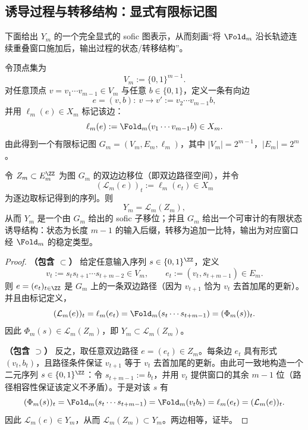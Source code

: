 \subsection{诱导过程与转移结构：显式有限标记图}\label{subsec:Phi_m-graph}

下面给出 $Y_m$ 的一个完全显式的 sofic 图表示，从而刻画“将 $\Fold_m$ 沿长轨迹连续重叠窗口施加后，输出过程的状态/转移结构”。

\begin{definition}\label{def:G_m}
令顶点集为
\[
V_m:=\{0,1\}^{m-1}.
\]
对任意顶点 $v=v_1\cdots v_{m-1}\in V_m$ 与任意 $b\in\{0,1\}$，定义一条有向边
\[
e=(v,b):\ v\to v':=v_2\cdots v_{m-1}b,
\]
并用 $\ell_m(e)\in X_m$ 标记该边：
\[
\ell_m(e):=\Fold_m(v_1\cdots v_{m-1}b)\in X_m.
\]
由此得到一个有限标记图 $G_m=(V_m,E_m,\ell_m)$，其中 $|V_m|=2^{m-1}$，$|E_m|=2^{m}$。
\end{definition}

\begin{theorem}\label{thm:Phi_m-sofic-graph}
令 $Z_m\subset E_m^{\ZZ}$ 为图 $G_m$ 的双边边移位（即双边路径空间），并令
\[
(\mathcal{L}_m(e))_t:=\ell_m(e_t)\in X_m
\]
为逐边取标记得到的序列。则
\[
Y_m=\mathcal{L}_m(Z_m),
\]
从而 $Y_m$ 是一个由 $G_m$ 给出的 sofic 子移位；并且 $G_m$ 给出一个可审计的有限状态诱导结构：状态为长度 $m-1$ 的输入后缀，转移为追加一比特，输出为对应窗口经 $\Fold_m$ 的稳定类型。
\end{theorem}

\begin{proof}
\textbf{（包含 $\subset$）} 给定任意输入序列 $s\in\{0,1\}^{\ZZ}$，定义
\[
v_t:=s_t s_{t+1}\cdots s_{t+m-2}\in V_m,\qquad
e_t:=(v_t,s_{t+m-1})\in E_m.
\]
则 $e=(e_t)_{t\in\ZZ}$ 是 $G_m$ 上的一条双边路径（因为 $v_{t+1}$ 恰为 $v_t$ 去首加尾的更新）。并且由标记定义，
\[
(\mathcal{L}_m(e))_t=\ell_m(e_t)=\Fold_m(s_t\cdots s_{t+m-1})=(\Phi_m(s))_t.
\]
因此 $\Phi_m(s)\in \mathcal{L}_m(Z_m)$，即 $Y_m\subset \mathcal{L}_m(Z_m)$。

\textbf{（包含 $\supset$）} 反之，取任意双边路径 $e=(e_t)\in Z_m$。每条边 $e_t$ 具有形式 $(v_t,b_t)$，且路径条件保证 $v_{t+1}$ 等于 $v_t$ 去首加尾的更新。由此可一致地构造一个二元序列 $s\in\{0,1\}^{\ZZ}$：令 $s_{t+m-1}:=b_t$，并用 $v_t$ 提供窗口的其余 $m-1$ 位（路径相容性保证该定义不矛盾）。于是对该 $s$ 有
\[
(\Phi_m(s))_t=\Fold_m(s_t\cdots s_{t+m-1})=\Fold_m(v_t b_t)=\ell_m(e_t)=(\mathcal{L}_m(e))_t.
\]
因此 $\mathcal{L}_m(e)\in Y_m$，从而 $\mathcal{L}_m(Z_m)\subset Y_m$。两边相等，证毕。
\end{proof}

